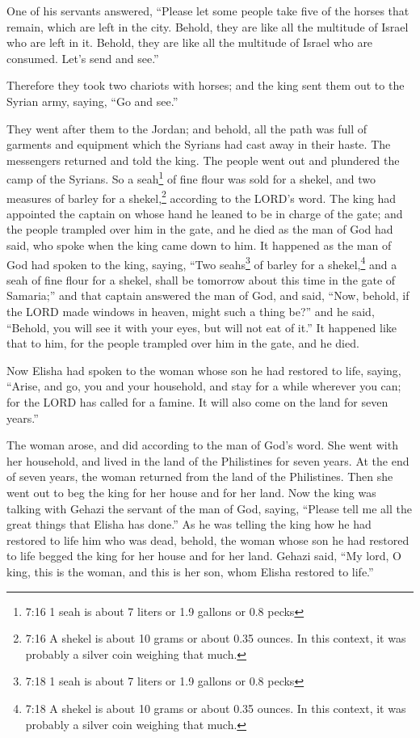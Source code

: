 \myverse{}One of his servants answered, “Please let some people take five
of the horses that remain, which are left in the city. Behold, they are like all the multitude of Israel
who are left in it. Behold, they are like all the multitude of Israel who are consumed. Let’s send and
see.”

\myverse{}Therefore they took two chariots with horses; and the king sent
them out to the Syrian army, saying, “Go and see.”

\myverse{}They went after them to the Jordan; and behold, all the path
was full of garments and equipment which the Syrians had cast away in their haste. The messengers returned
and told the king.
\myverse{}The people went out and plundered the camp of the Syrians. So a seah\footnote{7:16 1 seah is about 7 liters or 1.9 gallons or 0.8 pecks} of fine flour was sold for a shekel,
and two measures of barley for a shekel,\footnote{7:16 A shekel is about 10 grams or about 0.35 ounces. In this context, it was probably a silver coin
	weighing that much.} according to the LORD’s word.
\myverse{}The king had appointed the captain on whose hand he leaned to be in charge
of the gate; and the people trampled over him in the gate, and he died as the man of God had said, who
spoke when the king came down to him.
\myverse{}It happened as the man of God had spoken to the king, saying, “Two seahs\footnote{7:18 1 seah is about 7 liters or 1.9 gallons or 0.8 pecks} of barley for a shekel,\footnote{7:18 A shekel is about 10 grams or about 0.35 ounces. In this context, it was probably a silver coin
	weighing that much.} and a seah of fine flour for a shekel, shall be tomorrow about this time
in the gate of Samaria;”
\myverse{}and that captain answered the man of God, and said, “Now, behold, if the LORD
made windows in heaven, might such a thing be?” and he said, “Behold, you will see it with your eyes,
but will not eat of it.”
\myverse{}It happened like that to him, for the people trampled over him in the gate,
and he died.


\mychapter{} \myverse*{}Now Elisha had spoken to the woman whose son he had restored to
life, saying, “Arise, and go, you and your household, and stay for a while wherever you can; for the LORD
has called for a famine. It will also come on the land for seven years.”

\myverse{}The woman arose, and did according to the man of God’s word. She
went with her household, and lived in the land of the Philistines for seven years.
\myverse{}At the end of seven years, the woman returned from the land of the Philistines.
Then she went out to beg the king for her house and for her land.
\myverse{}Now the king was talking with Gehazi the servant of the man of God, saying,
“Please tell me all the great things that Elisha has done.”
\myverse{}As he was telling the king how he had restored to life him who was dead, behold,
the woman whose son he had restored to life begged the king for her house and for her land. Gehazi said,
“My lord, O king, this is the woman, and this is her son, whom Elisha restored to life.”

